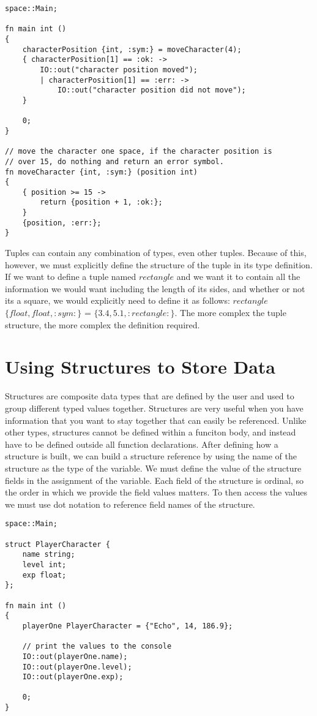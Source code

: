 \documentclass{article}
\begin{document}
\begin{lstlisting}
space::Main;

fn main int ()
{
	characterPosition {int, :sym:} = moveCharacter(4);
 	{ characterPosition[1] == :ok: ->
  		IO::out("character position moved");
    	| characterPosition[1] == :err: ->
     		IO::out("character position did not move");
	}

	0;
}

// move the character one space, if the character position is
// over 15, do nothing and return an error symbol.
fn moveCharacter {int, :sym:} (position int)
{
	{ position >= 15 ->
 		return {position + 1, :ok:};
	}
 	{position, :err:};
}
\end{lstlisting}

Tuples can contain any combination of types, even other tuples. Because of this, however, we must explicitly define the structure of the tuple in its type definition. If
we want to define a tuple named $rectangle$ and we want it to contain all the information we would want including the length of its sides, and whether or not its a square,
we would explicitly need to define it as follows: $rectangle$ $\{float, float, :sym:\}$ = $\{3.4, 5.1, :rectangle:\}$. The more complex the tuple structure, the more complex the
definition required.


\section{Using Structures to Store Data}

Structures are composite data types that are defined by the user and used to group different typed values together. Structures are very useful when you have information
that you want to stay together that can easily be referenced. Unlike other types, structures cannot be defined within a funciton body, and instead have to be defined outside all
function declarations. After defining how a structure is built, we can build a structure reference by using the name of the structure as the type of the variable. We must
define the value of the structure fields in the assignment of the variable. Each field of the structure is ordinal, so the order in which we provide
the field values matters. To then access the values we must use dot notation to reference field names of the structure.

\begin{lstlisting}
space::Main;

struct PlayerCharacter {
	name string;
	level int;
	exp float;
};

fn main int ()
{
	playerOne PlayerCharacter = {"Echo", 14, 186.9};

	// print the values to the console
	IO::out(playerOne.name);
	IO::out(playerOne.level);
	IO::out(playerOne.exp);

	0;
}
\end{lstlisting}
\end{document}
